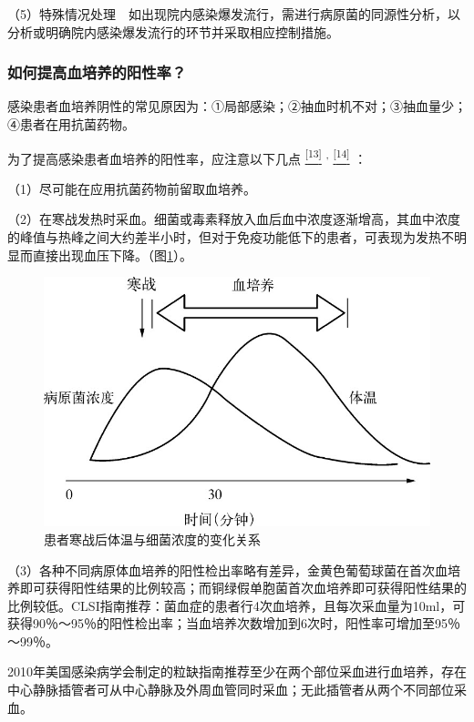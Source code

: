 （5）特殊情况处理　如出现院内感染爆发流行，需进行病原菌的同源性分析，以分析或明确院内感染爆发流行的环节并采取相应控制措施。

\subsubsection{如何提高血培养的阳性率？}

感染患者血培养阴性的常见原因为：①局部感染；②抽血时机不对；③抽血量少；④患者在用抗菌药物。

为了提高感染患者血培养的阳性率，应注意以下几点
\protect\hyperlink{text00031.htmlux5cux23ch13-30}{\textsuperscript{{[}13{]}}}
\textsuperscript{,}
\protect\hyperlink{text00031.htmlux5cux23ch14-30}{\textsuperscript{{[}14{]}}}
：

（1）尽可能在应用抗菌药物前留取血培养。

（2）在寒战发热时采血。细菌或毒素释放入血后血中浓度逐渐增高，其血中浓度的峰值与热峰之间大约差半小时，但对于免疫功能低下的患者，可表现为发热不明显而直接出现血压下降。（图\ref{fig25-2}）。

\begin{figure}[!htbp]
 \centering
 \includegraphics{./images/Image00291.jpg}
 \captionsetup{justification=centering}
 \caption{患者寒战后体温与细菌浓度的变化关系}
 \label{fig25-2}
  \end{figure} 

（3）各种不同病原体血培养的阳性检出率略有差异，金黄色葡萄球菌在首次血培养即可获得阳性结果的比例较高；而铜绿假单胞菌首次血培养即可获得阳性结果的比例较低。CLSI指南推荐：菌血症的患者行4次血培养，且每次采血量为10ml，可获得90％～95％的阳性检出率；当血培养次数增加到6次时，阳性率可增加至95％～99％。

2010年美国感染病学会制定的粒缺指南推荐至少在两个部位采血进行血培养，存在中心静脉插管者可从中心静脉及外周血管同时采血；无此插管者从两个不同部位采血。

